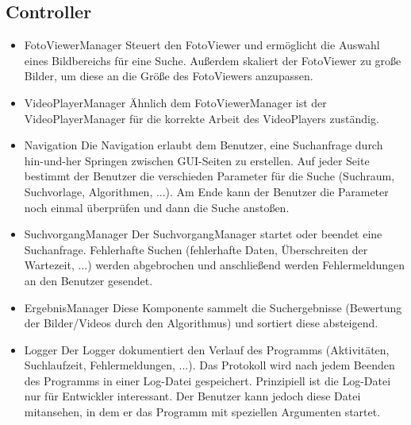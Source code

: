 \subsection{Controller}
\begin{itemize}
\item FotoViewerManager \newline
Steuert den FotoViewer und ermöglicht die Auswahl eines Bildbereichs für eine Suche. Außerdem skaliert der FotoViewer zu große Bilder, um diese an die Größe des FotoViewers anzupassen. 
\item VideoPlayerManager \newline
Ähnlich dem FotoViewerManager ist der VideoPlayerManager für die korrekte Arbeit des VideoPlayers zuständig.
\item Navigation \newline
Die Navigation erlaubt dem Benutzer, eine Suchanfrage durch hin-und-her Springen zwischen GUI-Seiten zu erstellen. Auf jeder Seite bestimmt der Benutzer die verschieden Parameter für die Suche (Suchraum, Suchvorlage, Algorithmen, ...). Am Ende kann der Benutzer die Parameter noch einmal überprüfen und dann die Suche anstoßen.
\item SuchvorgangManager \newline
Der SuchvorgangManager startet oder beendet eine Suchanfrage. Fehlerhafte Suchen (fehlerhafte Daten, Überschreiten der Wartezeit, ...) werden abgebrochen und anschließend werden Fehlermeldungen an den Benutzer gesendet.
\item ErgebnisManager \newline
Diese Komponente sammelt die Suchergebnisse (Bewertung der Bilder/Videos durch den Algorithmus) und sortiert diese absteigend.
\item Logger \newline
Der Logger dokumentiert den Verlauf des Programms (Aktivitäten, Suchlaufzeit, Fehlermeldungen, ...). Das Protokoll wird nach jedem Beenden des Programms in einer Log-Datei gespeichert. Prinzipiell ist die Log-Datei nur für Entwickler interessant. Der Benutzer kann jedoch diese Datei mitansehen, in dem er das Programm mit speziellen Argumenten startet.
\end{itemize}
\pagebreak
